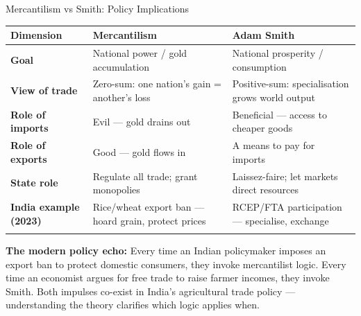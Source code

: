\documentclass[
  ignorenonframetext,
  aspectratio=169,
]{beamer}
\makeatletter
\let\quarto@originallabel\label
\DeclareRobustCommand*{\label}[1]{\quarto@originallabel{#1}}
\makeatother
\begin{document}
\begin{frame}{Mercantilism vs Smith: Policy Implications}
\label{mercantilism-vs-smith-policy-implications}
\begin{longtable}[]{@{}
  >{\raggedright\arraybackslash}p{}
  >{\raggedright\arraybackslash}p{}
  >{\raggedright\arraybackslash}p{}@{}}
\toprule\noalign{}
\begin{minipage}[b]{\linewidth}\raggedright
Dimension
\end{minipage} & \begin{minipage}[b]{\linewidth}\raggedright
Mercantilism
\end{minipage} & \begin{minipage}[b]{\linewidth}\raggedright
Adam Smith
\end{minipage} \\
\midrule\noalign{}
\endhead
\textbf{Goal} & National power / gold accumulation & National prosperity
/ consumption \\
\textbf{View of trade} & Zero-sum: one nation's gain = another's loss &
Positive-sum: specialisation grows world output \\
\textbf{Role of imports} & Evil --- gold drains out & Beneficial ---
access to cheaper goods \\
\textbf{Role of exports} & Good --- gold flows in & A means to pay for
imports \\
\textbf{State role} & Regulate all trade; grant monopolies &
Laissez-faire; let markets direct resources \\
\textbf{India example (2023)} & Rice/wheat export ban --- hoard grain,
protect prices & RCEP/FTA participation --- specialise, exchange \\
\bottomrule\noalign{}
\end{longtable}

\textbf{The modern policy echo:} Every time an Indian policymaker
imposes an export ban to protect domestic consumers, they invoke
mercantilist logic. Every time an economist argues for free trade to
raise farmer incomes, they invoke Smith. Both impulses co-exist in
India's agricultural trade policy --- understanding the theory clarifies
which logic applies when.
\end{frame}
\end{document}
